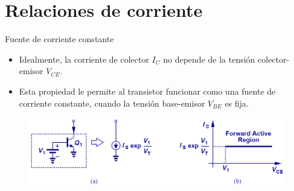 \documentclass[t,aspectratio=169]{beamer}
\begin{document}
\section{Relaciones de corriente}
\begin{frame}{Fuente de corriente constante}

\begin{itemize}
    \item Idealmente, la corriente de colector $I_C$ no depende de la tensión colector-emisor $V_{CE}$.
    \item Esta propiedad le permite al transistor funcionar como una fuente de corriente constante, cuando la tensión base-emisor $V_{BE}$ es fija.
\end{itemize}

\begin{figure}
    \centering
    \includegraphics[width=\textwidth]{figures/transistor_como_fuente_corriente.png}
\end{figure}
    
\end{frame}
\end{document}

